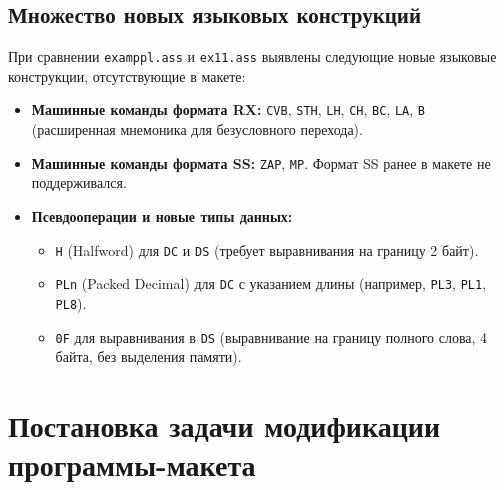 \documentclass[12pt, a4paper]{article}
\begin{document}
\normalsize

\subsection{Множество новых языковых конструкций}
При сравнении \texttt{examppl.ass} и \texttt{ex11.ass} выявлены следующие новые языковые конструкции, отсутствующие в макете:
\begin{itemize}
    \item \textbf{Машинные команды формата RX:} \texttt{CVB}, \texttt{STH}, \texttt{LH}, \texttt{CH}, \texttt{BC}, \texttt{LA}, \texttt{B} (расширенная мнемоника для безусловного перехода).
    \item \textbf{Машинные команды формата SS:} \texttt{ZAP}, \texttt{MP}. Формат SS ранее в макете не поддерживался.
    \item \textbf{Псевдооперации и новые типы данных:}
    \begin{itemize}
        \item \texttt{H} (Halfword) для \texttt{DC} и \texttt{DS} (требует выравнивания на границу 2 байт).
        \item \texttt{PLn} (Packed Decimal) для \texttt{DC} с указанием длины (например, \texttt{PL3}, \texttt{PL1}, \texttt{PL8}).
        \item \texttt{0F} для выравнивания в \texttt{DS} (выравнивание на границу полного слова, 4 байта, без выделения памяти).
    \end{itemize}
\end{itemize}

\section{Постановка задачи модификации программы-макета}
\end{document}
